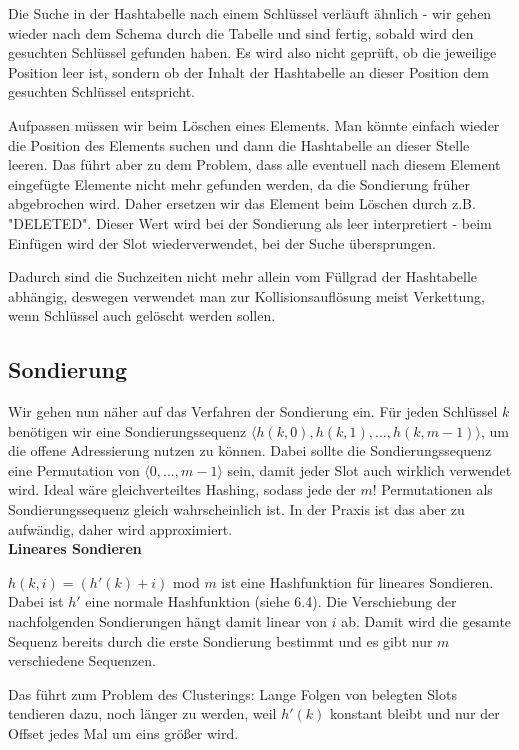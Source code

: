 \documentclass[12pt]{article}
\begin{document}
Die Suche in der Hashtabelle nach einem Schlüssel verläuft ähnlich - wir gehen wieder nach dem Schema durch die Tabelle und sind fertig, sobald wird den gesuchten Schlüssel gefunden haben. Es wird also nicht geprüft, ob die jeweilige Position leer ist, sondern ob der Inhalt der Hashtabelle an dieser Position dem gesuchten Schlüssel entspricht.

Aufpassen müssen wir beim Löschen eines Elements. Man könnte einfach wieder die Position des Elements suchen und dann die Hashtabelle an dieser Stelle leeren. Das führt aber zu dem Problem, dass alle eventuell nach diesem Element eingefügte Elemente nicht mehr gefunden werden, da die Sondierung früher abgebrochen wird. Daher ersetzen wir das Element beim Löschen durch z.B. "DELETED". Dieser Wert wird bei der Sondierung als leer interpretiert - beim Einfügen wird der Slot wiederverwendet, bei der Suche übersprungen.

Dadurch sind die Suchzeiten nicht mehr allein vom Füllgrad der Hashtabelle abhängig, deswegen verwendet man zur Kollisionsauflösung meist Verkettung, wenn Schlüssel auch gelöscht werden sollen.

\subsection{Sondierung}

Wir gehen nun näher auf das Verfahren der Sondierung ein. Für jeden Schlüssel $k$ benötigen wir eine Sondierungssequenz $\langle{}h(k,0), h(k,1), ..., h(k, m-1)\rangle$, um die offene Adressierung nutzen zu können. Dabei sollte die Sondierungssequenz eine Permutation von $\langle{}0, ..., m-1\rangle$ sein, damit jeder Slot auch wirklich verwendet wird. Ideal wäre gleichverteiltes Hashing, sodass jede der $m!$ Permutationen als Sondierungssequenz gleich wahrscheinlich ist. In der Praxis ist das aber zu aufwändig, daher wird approximiert.\\

\textbf{Lineares Sondieren}

$h(k, i) = (h'(k) + i)$ mod $m$ ist eine Hashfunktion für lineares Sondieren. Dabei ist $h'$ eine normale Hashfunktion (siehe 6.4). Die Verschiebung der nachfolgenden Sondierungen hängt damit linear von $i$ ab. Damit wird die gesamte Sequenz bereits durch die erste Sondierung bestimmt und es gibt nur $m$ verschiedene Sequenzen.

Das führt zum Problem des Clusterings: Lange Folgen von belegten Slots tendieren dazu, noch länger zu werden, weil $h'(k)$ konstant bleibt und nur der Offset jedes Mal um eins größer wird.\\
\end{document}
